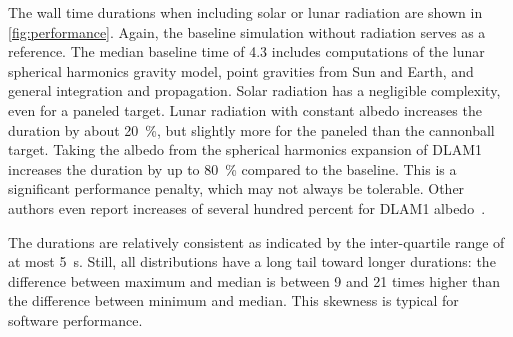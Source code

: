 The wall time durations when including solar or lunar radiation are shown in \cref{fig:performance}. Again, the baseline simulation without radiation serves as a reference. The median baseline time of \qty{4.3}{\min} includes computations of the lunar spherical harmonics gravity model, point gravities from Sun and Earth, and general integration and propagation. Solar radiation has a negligible complexity, even for a paneled target. Lunar radiation with constant albedo increases the duration by about \qty{20}{\percent}, but slightly more for the paneled than the cannonball target. Taking the albedo from the spherical harmonics expansion of \gls{DLAM1} increases the duration by up to \qty{80}{\percent} compared to the baseline. This is a significant performance penalty, which may not always be tolerable. Other authors even report increases of several hundred percent for \gls{DLAM1} albedo~\cite{Nicholson2010}.

The durations are relatively consistent as indicated by the inter-quartile range of at most \qty{5}{\s}. Still, all distributions have a long tail toward longer durations: the difference between maximum and median is between 9 and 21 times higher than the difference between minimum and median. This skewness is typical for software performance.
